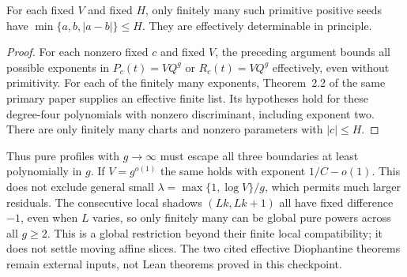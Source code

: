 \begin{theorem}\label{as-finite}
For each fixed $V$ and fixed $H$, only finitely many such primitive
positive seeds have $\min\{a,b,|a-b|\}\le H$. They are effectively
determinable in principle.
\end{theorem}
\begin{proof}
For each nonzero fixed $c$ and fixed $V$, the preceding argument bounds
all possible exponents in $P_c(t)=VQ^g$ or $R_c(t)=VQ^g$ effectively,
even without primitivity. For each of the finitely many exponents,
Theorem~2.2 of the same primary paper supplies an effective finite
list. Its hypotheses hold for these degree-four polynomials with
nonzero discriminant, including exponent two. There are only finitely
many charts and nonzero parameters with $|c|\le H$.
\end{proof}

Thus pure profiles with $g\to\infty$ must escape all three boundaries
at least polynomially in $g$. If $V=g^{o(1)}$ the same holds with
exponent $1/C-o(1)$. This does not exclude general small
$\lambda=\max\{1,\log V\}/g$, which permits much larger residuals.
The consecutive local shadows $(Lk,Lk+1)$ all have fixed difference
$-1$, even when $L$ varies, so only finitely many can be global pure
powers across all $g\ge2$. This is a global restriction beyond their
finite local compatibility; it does not settle moving affine slices.
The two cited effective Diophantine theorems remain external inputs,
not Lean theorems proved in this checkpoint.
